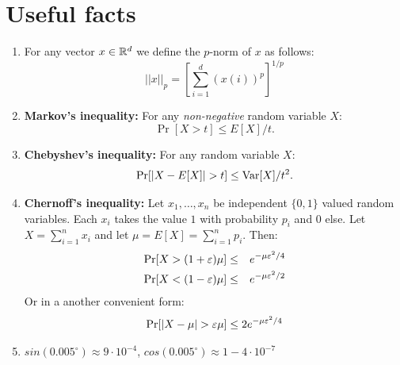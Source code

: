 \documentclass{article}
\begin{document}
\section*{Useful facts}
\begin{enumerate}
\item For any vector $x \in {\mathbb{R}}^{d}$ we define the $p$-norm of $x$ as
follows:
\[
||x||_p = [\sum_{i=1}^{d}(x(i))^p]^{1/p}
\]

\item {\bf Markov's inequality:} For any {\it non-negative} random variable
$X$:
\[
\Pr[X > t] \le E[X]/t.
\]
\item {\bf Chebyshev's inequality:} For any random variable $X$:
\[
\Pr[|X - E[X]| > t] \le {\operatorname{Var}}[X]/t^2.
\]
\item {\bf Chernoff's inequality:} Let $x_1,\ldots,x_n$ be independent
$\{0,1\}$ valued random variables. Each $x_i$ takes the value $1$
with probability $p_i$ and $0$ else. Let $X = \sum_{i=1}^{n}x_i$ and
let $\mu = E[X] = \sum_{i=1}^{n}p_i$. Then:
\begin{eqnarray*}
\Pr[X > (1+\varepsilon)\mu] &\le& e^{-\mu \varepsilon^2/4}\\
\Pr[X < (1-\varepsilon)\mu] &\le& e^{-\mu \varepsilon^2/2}
\end{eqnarray*}
Or in a another convenient form:
\[
\Pr[|X - \mu| > \varepsilon\mu] \le 2e^{-\mu \varepsilon^2/4}
\]

%
\item $sin(0.005^{\circ}) \approx 9\cdot10^{-4} $, $cos(0.005^{\circ}) \approx 1 - 4\cdot10^{-7}$
\end{enumerate}

\pagebreak
\end{document}

